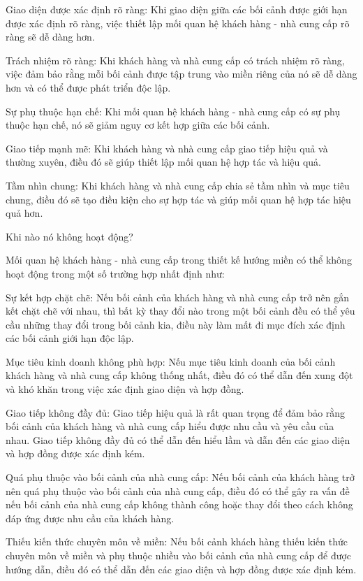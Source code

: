 Giao diện được xác định rõ ràng: Khi giao diện giữa các bối cảnh được giới hạn được xác định rõ ràng, việc thiết lập mối quan hệ khách hàng - nhà cung cấp rõ ràng sẽ dễ dàng hơn.

Trách nhiệm rõ ràng: Khi khách hàng và nhà cung cấp có trách nhiệm rõ ràng, việc đảm bảo rằng mỗi bối cảnh được tập trung vào miền riêng của nó sẽ dễ dàng hơn và có thể được phát triển độc lập.

Sự phụ thuộc hạn chế: Khi mối quan hệ khách hàng - nhà cung cấp có sự phụ thuộc hạn chế, nó sẽ giảm nguy cơ kết hợp giữa các bối cảnh.

Giao tiếp mạnh mẽ: Khi khách hàng và nhà cung cấp giao tiếp hiệu quả và thường xuyên, điều đó sẽ giúp thiết lập mối quan hệ hợp tác và hiệu quả.

Tầm nhìn chung: Khi khách hàng và nhà cung cấp chia sẻ tầm nhìn và mục tiêu chung, điều đó sẽ tạo điều kiện cho sự hợp tác và giúp mối quan hệ hợp tác hiệu quả hơn.

Khi nào nó không hoạt động?

Mối quan hệ khách hàng - nhà cung cấp trong thiết kế hướng miền có thể không hoạt động trong một số trường hợp nhất định như:

Sự kết hợp chặt chẽ: Nếu bối cảnh của khách hàng và nhà cung cấp trở nên gắn kết chặt chẽ với nhau, thì bất kỳ thay đổi nào trong một bối cảnh đều có thể yêu cầu những thay đổi trong bối cảnh kia, điều này làm mất đi mục đích xác định các bối cảnh giới hạn độc lập.

Mục tiêu kinh doanh không phù hợp: Nếu mục tiêu kinh doanh của bối cảnh khách hàng và nhà cung cấp không thống nhất, điều đó có thể dẫn đến xung đột và khó khăn trong việc xác định giao diện và hợp đồng.

Giao tiếp không đầy đủ: Giao tiếp hiệu quả là rất quan trọng để đảm bảo rằng bối cảnh của khách hàng và nhà cung cấp hiểu được nhu cầu và yêu cầu của nhau. Giao tiếp không đầy đủ có thể dẫn đến hiểu lầm và dẫn đến các giao diện và hợp đồng được xác định kém.

Quá phụ thuộc vào bối cảnh của nhà cung cấp: Nếu bối cảnh của khách hàng trở nên quá phụ thuộc vào bối cảnh của nhà cung cấp, điều đó có thể gây ra vấn đề nếu bối cảnh của nhà cung cấp không thành công hoặc thay đổi theo cách không đáp ứng được nhu cầu của khách hàng.

Thiếu kiến thức chuyên môn về miền: Nếu bối cảnh khách hàng thiếu kiến thức chuyên môn về miền và phụ thuộc nhiều vào bối cảnh của nhà cung cấp để được hướng dẫn, điều đó có thể dẫn đến các giao diện và hợp đồng được xác định kém.





